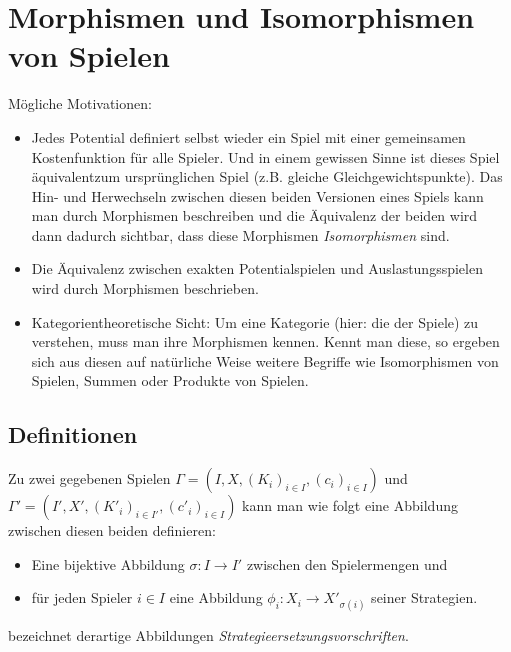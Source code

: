 \section[Morphismen]{Morphismen und Isomorphismen von Spielen}\label{sec:Morphismen}


Mögliche Motivationen:
\begin{itemize}
	\item Jedes Potential definiert selbst wieder ein Spiel mit einer gemeinsamen Kostenfunktion für alle Spieler. Und in einem gewissen Sinne ist dieses Spiel \glqq äquivalent\grqq zum ursprünglichen Spiel (z.B. gleiche Gleichgewichtspunkte). Das Hin- und Herwechseln zwischen diesen beiden Versionen eines Spiels kann man durch Morphismen beschreiben und die Äquivalenz der beiden wird dann dadurch sichtbar, dass diese Morphismen \emph{Isomorphismen} sind.
	\item Die Äquivalenz zwischen exakten Potentialspielen und Auslastungsspielen wird durch Morphismen beschrieben.
	\item Kategorientheoretische Sicht: Um eine Kategorie (hier: die der Spiele) zu verstehen, muss man ihre Morphismen kennen. Kennt man diese, so ergeben sich aus diesen auf natürliche Weise weitere Begriffe wie Isomorphismen von Spielen, Summen oder Produkte von Spielen.
\end{itemize}


\subsection{Definitionen}

Zu zwei gegebenen Spielen $\Gamma = (I, X, (K_i)_{i\in I}, (c_i)_{i\in I})$ und $\Gamma' = (I', X', (K'_i)_{i\in I'}, (c'_i)_{i\in I})$ kann man wie folgt eine Abbildung zwischen diesen beiden definieren:
\begin{itemize}
	\item Eine bijektive Abbildung $\sigma: I \to I'$ zwischen den Spielermengen und
	\item für jeden Spieler $i \in I$ eine Abbildung $\phi_i: X_i \to X'_{\sigma(i)}$ seiner Strategien.
\end{itemize}
\cite{Polyequilibrium} bezeichnet derartige Abbildungen \emph{Strategieersetzungsvorschriften}.


